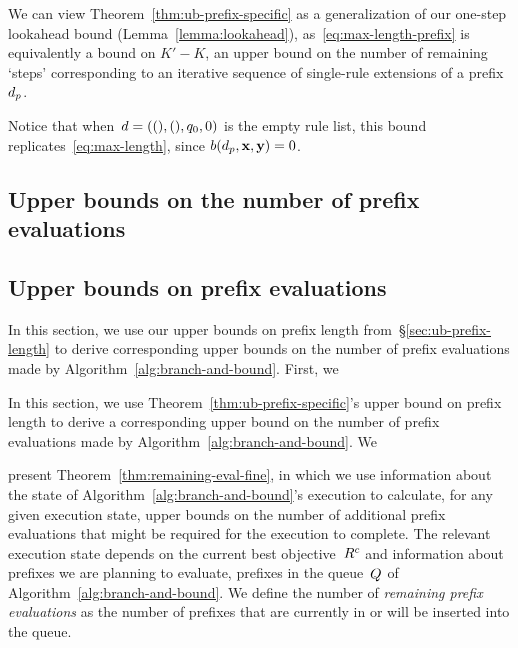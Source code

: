 We can view Theorem~\ref{thm:ub-prefix-specific} as a generalization
of our one-step lookahead bound (Lemma~\ref{lemma:lookahead}),
as~\eqref{eq:max-length-prefix} is equivalently a bound on ${K' - K}$,
an upper bound on the number of remaining `steps' corresponding to
an iterative sequence of single-rule extensions of a prefix~$d_p$.
%
\begin{arxiv}
Notice that when~${{d} = ((), (), q_0, 0)}$ is the empty rule list,
this bound replicates~\eqref{eq:max-length}, since ${b(d_p, \mathbf{x}, \mathbf{y}) = 0}$.
\end{arxiv}

\begin{arxiv}
\subsection{Upper bounds on the number of prefix evaluations}
\end{arxiv}
\begin{kdd}
\subsection{Upper bounds on prefix evaluations}
\end{kdd}
\label{sec:ub-size}

\begin{arxiv}
In this section, we use our upper bounds on prefix length
from~\S\ref{sec:ub-prefix-length} to derive corresponding
upper bounds on the number of prefix evaluations made by
Algorithm~\ref{alg:branch-and-bound}.
%
First, we
\end{arxiv}
\begin{kdd}
In this section, we use Theorem~\ref{thm:ub-prefix-specific}'s
upper bound on prefix length to derive a corresponding
upper bound on the number of prefix evaluations made by
Algorithm~\ref{alg:branch-and-bound}.
%
We
\end{kdd}
present Theorem~\ref{thm:remaining-eval-fine},
in which we use information about the state of
Algorithm~\ref{alg:branch-and-bound}'s execution
to calculate, for any given execution state,
upper bounds on the number of additional prefix evaluations that might
be required for the execution to complete.
%
The relevant execution state depends on the current
best objective~${R^c}$ and information about
prefixes we are planning to evaluate, \ie prefixes in the
queue~$Q$ of Algorithm~\ref{alg:branch-and-bound}.
%
We define the number of \emph{remaining prefix evaluations} as the number of
prefixes that are currently in or will be inserted into the queue.

